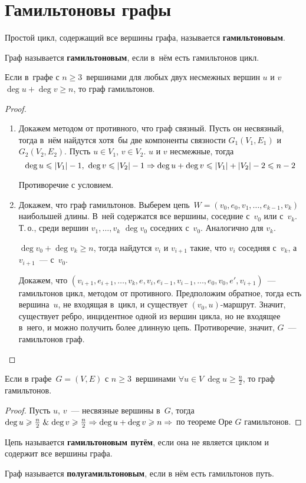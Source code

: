 \section{Гамильтоновы графы}
Простой цикл, содержащий все вершины графа, называется \textbf{гамильтоновым}.

 Граф называется \textbf{гамильтоновым}, если в~нём есть гамильтонов цикл.

\begin{theorem}[Оре]
Если в~графе с $n \geqslant 3$~вершинами для любых двух несмежных вершин $u$ и $v$ $\deg u + \deg v \geqslant n$, то граф гамильтонов.
\end{theorem}
\begin{proof}
\begin{enumerate}
	\item Докажем методом от противного, что граф связный.
	Пусть он несвязный, тогда в~нём найдутся хотя~бы две компоненты связности $G_1(V_1, E_1)$ и $G_2(V_2, E_2)$.
	Пусть $u \in V_1$, $v \in V_2$. $u$ и $v$ несмежные, тогда
	\begin{equation*}
	\deg u \leqslant |V_1| - 1, \ \deg v \leqslant |V_2| - 1 \opbr\Rightarrow \deg u + \deg v \opbr\leqslant |V_1| + |V_2| - 2 \opbr\leqslant n - 2
	\end{equation*}
	
	Противоречие с условием.
	
	\item Докажем, что граф гамильтонов.
	Выберем цепь~$W = (v_0, e_0, v_1, \ldots, e_{k-1}, v_k)$ наибольшей длины.
	В~ней содержатся все вершины, соседние с~$v_0$ или с~$v_k$.
	Т.\,о., среди вершин $v_1, \ldots, v_k$ $\deg v_0$ соседних с~$v_0$.
	Аналогично для $v_k$.
	
	$\deg v_0 + \deg v_k \geqslant n$, тогда найдутся $v_i$ и $v_{i+1}$ такие, что $v_i$ соседняя с~$v_k$, а $v_{i+1}$~--- с~$v_0$.
	
	Докажем, что $(v_{i+1}, e_{i+1}, \ldots, v_k, e, v_i, e_{i-1}, v_{i-1}, \ldots, e_0, v_0, e', v_{i+1})$~--- гамильтонов цикл, методом от противного.
	Предположим обратное, тогда есть вершина~$u$, не входящая в~цикл, и существует $(v_0, u)$-маршрут.
	Значит, существует ребро, инцидентное одной из вершин цикла, но не входящее в~него, и можно получить более длинную цепь.
	Противоречие, значит, $G$~--- гамильтонов граф.
\end{enumerate}
\end{proof}

\begin{theorem}[Дирака]
\label{th:Dirac}
Если в графе~$G = (V, E)$ с $n \geqslant 3$~вершинами $\forall u \in V \ \deg u \geqslant \frac{n}2$, то граф гамильтонов.
\end{theorem}
\begin{proof}
Пусть $u$, $v$~--- несвязные вершины в~$G$, тогда $\deg u \geqslant \frac{n}2 \lAnd \deg v \geqslant \frac{n}2 \opbr\Rightarrow \deg u \opbr+ \deg v \opbr\geqslant n \Rightarrow$ по теореме Оре $G$ гамильтонов.
\end{proof}

Цепь называется \textbf{гамильтоновым путём}, если она не является циклом и содержит все вершины графа.

 Граф называется \textbf{полугамильтоновым}, если в нём есть гамильтонов путь.